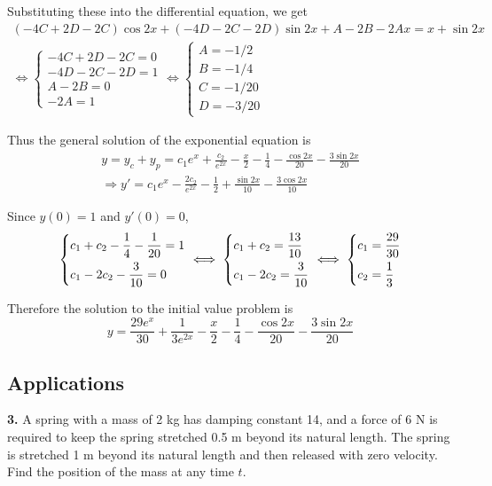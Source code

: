 \documentclass[a4paper,12pt]{article}
\newcommand{\exercise}[1]{\noindent\textbf{#1.}}
\begin{document}
Substituting these into the differential equation, we get
\begin{multline*}
  (-4C + 2D - 2C)\cos 2x + (-4D - 2C - 2D)\sin 2x + A - 2B - 2Ax = x + \sin 2x\\
  \iff\begin{cases}
    -4C + 2D - 2C = 0\\
    -4D - 2C - 2D = 1\\
    A - 2B = 0\\
    -2A = 1
  \end{cases}
  \iff\begin{cases}
    A = -1/2\\
    B = -1/4\\
    C = -1/20\\
    D = -3/20
  \end{cases}
\end{multline*}

Thus the general solution of the exponential equation is
\begin{multline*}
  y = y_c + y_p = c_1 e^x + \frac{c_2}{e^{2x}} - \frac{x}{2} - \frac{1}{4}
    - \frac{\cos 2x}{20} - \frac{3\sin 2x}{20}\\
  \Longrightarrow y' = c_1 e^x - \frac{2c_2}{e^{2x}} - \frac{1}{2}
    + \frac{\sin 2x}{10} - \frac{3\cos 2x}{10}
\end{multline*}

Since $y(0) = 1$ and $y'(0) = 0$,
\[\begin{dcases}
  c_1 + c_2 - \frac{1}{4} - \frac{1}{20} = 1\\
  c_1 - 2c_2 - \frac{3}{10} = 0
\end{dcases}
\iff \begin{dcases}
  c_1 + c_2 = \frac{13}{10}\\
  c_1 - 2c_2 = \frac{3}{10}
\end{dcases}
\iff \begin{dcases}
  c_1 = \frac{29}{30}\\
  c_2 = \frac{1}{3}
\end{dcases}\]

Therefore the solution to the initial value problem is
\[y = \frac{29e^x}{30} + \frac{1}{3e^{2x}} - \frac{x}{2} - \frac{1}{4}
    - \frac{\cos 2x}{20} - \frac{3\sin 2x}{20}\]

\subsection{Applications}
\exercise{3} A spring with a mass of 2 kg has damping constant 14, and a force
of 6 N is required to keep the spring stretched 0.5 m beyond its natural
length. The spring is stretched 1 m beyond its natural length and then
released with zero velocity. Find the position of the mass at any time $t$.
\end{document}

